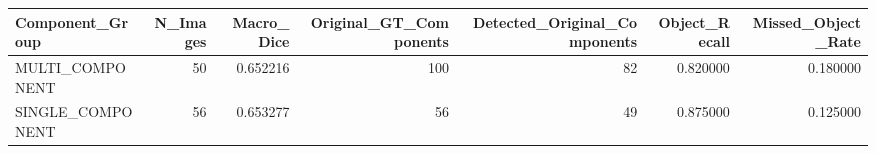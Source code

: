 \begin{tabular}{lrrrrrr}
\toprule
Component_Group & N_Images & Macro_Dice & Original_GT_Components & Detected_Original_Components & Object_Recall & Missed_Object_Rate \\
\midrule
MULTI_COMPONENT & 50 & 0.652216 & 100 & 82 & 0.820000 & 0.180000 \\
SINGLE_COMPONENT & 56 & 0.653277 & 56 & 49 & 0.875000 & 0.125000 \\
\bottomrule
\end{tabular}
